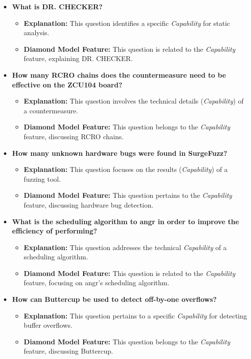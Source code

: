 \documentclass{article}
\begin{document}
\begin{itemize}
    \item \textbf{What is DR. CHECKER?}
    \begin{itemize}
        \item \textbf{Explanation:} This question identifies a specific \textit{Capability} for static analysis.
        \item \textbf{Diamond Model Feature:} This question is related to the \textit{Capability} feature, explaining DR. CHECKER.
    \end{itemize}

    \item \textbf{How many RCRO chains does the countermeasure need to be effective on the ZCU104 board?}
    \begin{itemize}
        \item \textbf{Explanation:} This question involves the technical details (\textit{Capability}) of a countermeasure.
        \item \textbf{Diamond Model Feature:} This question belongs to the \textit{Capability} feature, discussing RCRO chains.
    \end{itemize}

    \item \textbf{How many unknown hardware bugs were found in SurgeFuzz?}
    \begin{itemize}
        \item \textbf{Explanation:} This question focuses on the results (\textit{Capability}) of a fuzzing tool.
        \item \textbf{Diamond Model Feature:} This question pertains to the \textit{Capability} feature, discussing hardware bug detection.
    \end{itemize}

    \item \textbf{What is the scheduling algorithm to angr in order to improve the efficiency of performing?}
    \begin{itemize}
        \item \textbf{Explanation:} This question addresses the technical \textit{Capability} of a scheduling algorithm.
        \item \textbf{Diamond Model Feature:} This question is related to the \textit{Capability} feature, focusing on angr's scheduling algorithm.
    \end{itemize}

    \item \textbf{How can Buttercup be used to detect off-by-one overflows?}
    \begin{itemize}
        \item \textbf{Explanation:} This question pertains to a specific \textit{Capability} for detecting buffer overflows.
        \item \textbf{Diamond Model Feature:} This question belongs to the \textit{Capability} feature, discussing Buttercup.
    \end{itemize}


\end{itemize}
\end{document}
